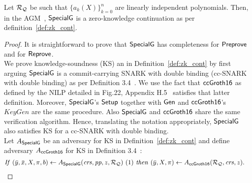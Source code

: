 \begin{theorem}
\label{sec_specialg}
Let $\mathcal{R}_{\mathcal{Q}}$ be such that $\{a_k(X)\}_{k=0}^n$ are linearly independent polynomials. Then, in the 
AGM~\cite{Fuchs_AGM}, ${\mathsf{SpecialG}}$ is a zero-knowledge continuation as per definition~\ref{def:zk_cont}. 
\end{theorem}
\begin{proof} It is straightforward to prove that ${\mathsf{SpecialG}}$ has completeness for ${\mathsf{Preprove}}$ and for ${\mathsf{Reprove}}$. \\

\noindent We prove knowledge-soundness (KS) an in Definition~\ref{def:zk_cont} by first arguing ${\mathsf{SpecialG}}$ is a 
commit-carrying SNARK with double binding (cc-SNARK with double binding) as per Definition 3.4~\cite{LegoSNARK}. 
We use the fact that ${\mathsf{ccGroth16}}$ as defined by the NILP detailed in Fig.22, Appendix H.5~\cite{LegoSNARK} satisfies that latter definition. Moreover, 
${\mathsf{SpecialG}}$'s ${\mathsf{Setup}}$ together with $\mathsf{Gen}$ and ${\mathsf{ccGroth16}}$'s $\mathit{KeyGen}$ are the same procedure. Also ${\mathsf{SpecialG}}$ 
and ${\mathsf{ccGroth16}}$ share the same verification algorithm. Hence, translating the notation appropriately, ${\mathsf{SpecialG}}$ also satisfies KS 
for a cc-SNARK with double binding. \\

\noindent Let $A_{{\mathsf{SpecialG}}}$ be an adversary for KS in Definition~\ref{def:zk_cont} and 
define adversary $A_{{\mathsf{ccGroth16}}}$ for KS  in Definition 3.4~\cite{LegoSNARK}:
\begin{align*}
&\mathit{If} \ (\bar{y}, \bar{x}, X, \pi, b) \leftarrow A_{{\mathsf{SpecialG}}} (\mathit{crs}, \mathit{pp}, z, \mathcal{R}_{\mathcal{Q}})\  (1)\ \mathit{then} \ (\bar{y}, X, \pi) \leftarrow A_{{\mathsf{ccGroth16}}} (\mathcal{R}_{\mathcal{Q}}, \mathit{crs}, z).
\end{align*}


\end{proof}
